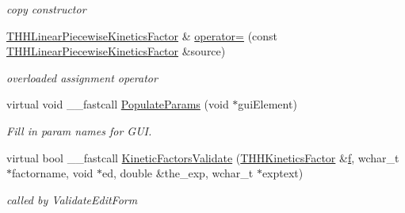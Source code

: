 \begin{DoxyCompactItemize}
\begin{DoxyCompactList}\small\item\em copy constructor \end{DoxyCompactList}\item 
\hypertarget{class_t_h_h_linear_piecewise_kinetics_factor_a9ba6e423ce1840c05795bff77aab10f3}{\hyperlink{class_t_h_h_linear_piecewise_kinetics_factor}{T\+H\+H\+Linear\+Piecewise\+Kinetics\+Factor} \& \hyperlink{class_t_h_h_linear_piecewise_kinetics_factor_a9ba6e423ce1840c05795bff77aab10f3}{operator=} (const \hyperlink{class_t_h_h_linear_piecewise_kinetics_factor}{T\+H\+H\+Linear\+Piecewise\+Kinetics\+Factor} \&source)}\label{class_t_h_h_linear_piecewise_kinetics_factor_a9ba6e423ce1840c05795bff77aab10f3}

\begin{DoxyCompactList}\small\item\em overloaded assignment operator \end{DoxyCompactList}\item 
\hypertarget{class_t_h_h_linear_piecewise_kinetics_factor_a00b0a552987402d93499975e01d9bcaf}{virtual void \+\_\+\+\_\+fastcall \hyperlink{class_t_h_h_linear_piecewise_kinetics_factor_a00b0a552987402d93499975e01d9bcaf}{Populate\+Params} (void $\ast$gui\+Element)}\label{class_t_h_h_linear_piecewise_kinetics_factor_a00b0a552987402d93499975e01d9bcaf}

\begin{DoxyCompactList}\small\item\em Fill in param names for G\+U\+I. \end{DoxyCompactList}\item 
\hypertarget{class_t_h_h_linear_piecewise_kinetics_factor_ae4bcfffda552e54170faf1d2737cfb15}{virtual bool \+\_\+\+\_\+fastcall \hyperlink{class_t_h_h_linear_piecewise_kinetics_factor_ae4bcfffda552e54170faf1d2737cfb15}{Kinetic\+Factors\+Validate} (\hyperlink{class_t_h_h_kinetics_factor}{T\+H\+H\+Kinetics\+Factor} \&\hyperlink{class_t_h_h_kinetics_factor_aa58fa2b2da61a14dd674f22d32a62248}{f}, wchar\+\_\+t $\ast$factorname, void $\ast$ed, double \&the\+\_\+exp, wchar\+\_\+t $\ast$exptext)}\label{class_t_h_h_linear_piecewise_kinetics_factor_ae4bcfffda552e54170faf1d2737cfb15}

\begin{DoxyCompactList}\small\item\em called by Validate\+Edit\+Form \end{DoxyCompactList}\end{DoxyCompactItemize}
